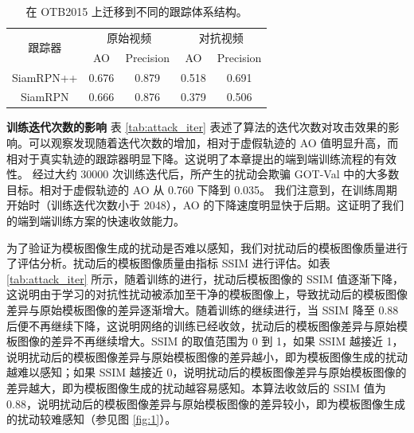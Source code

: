 \begin{table}[t]
\caption{在 OTB2015 上迁移到不同的跟踪体系结构。}
\centering
\begin{tabular}{ccccc} 
\toprule
\multirow{2}{*}[-2pt]{跟踪器} & \multicolumn{2}{c}{原始视频} & \multicolumn{2}{c}{对抗视频}  \\
\cmidrule(lr){2-3} \cmidrule(lr){4-5}
                          & AO & Precision              & AO & Precision                   \\
\midrule
SiamRPN++                 & 0.676   & 0.879                  & 0.518   & 0.691                       \\
SiamRPN                   & 0.666   & 0.876                  & 0.379   & 0.506                       \\
\bottomrule
\end{tabular}
\label{tab:arch}
\end{table}

\textbf{训练迭代次数的影响} 表 \ref{tab:attack_iter} 表述了算法的迭代次数对攻击效果的影响。可以观察发现随着迭代次数的增加，相对于虚假轨迹的 AO 值明显升高，而相对于真实轨迹的跟踪器明显下降。这说明了本章提出的端到端训练流程的有效性。
经过大约 30000 次训练迭代后，所产生的扰动会欺骗 GOT-Val 中的大多数目标。相对于虚假轨迹的 AO 从 0.760 下降到 0.035。
我们注意到，在训练周期开始时（训练迭代次数小于 2048），AO 的下降速度明显快于后期。这证明了我们的端到端训练方案的快速收敛能力。

为了验证为模板图像生成的扰动是否难以感知，我们对扰动后的模板图像质量进行了评估分析。扰动后的模板图像质量由指标 SSIM 进行评估。如表 \ref{tab:attack_iter} 所示，随着训练的进行，扰动后模板图像的 SSIM 值逐渐下降，这说明由于学习的对抗性扰动被添加至干净的模板图像上，导致扰动后的模板图像差异与原始模板图像的差异逐渐增大。随着训练的继续进行，当 SSIM 降至 0.88 后便不再继续下降，这说明网络的训练已经收敛，扰动后的模板图像差异与原始模板图像的差异不再继续增大。SSIM 的取值范围为 0 到 1，如果 SSIM 越接近 1，说明扰动后的模板图像差异与原始模板图像的差异越小，即为模板图像生成的扰动越难以感知；如果 SSIM 越接近 0，说明扰动后的模板图像差异与原始模板图像的差异越大，即为模板图像生成的扰动越容易感知。本算法收敛后的 SSIM 值为 0.88，说明扰动后的模板图像差异与原始模板图像的差异较小，即为模板图像生成的扰动较难感知（参见图 \ref{fig:1}）。

